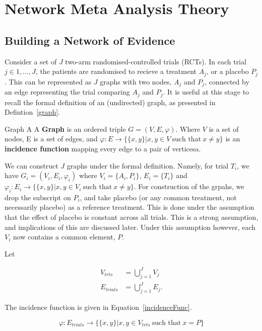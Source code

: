 \chapter{Network Meta Analysis Theory}\label{nmatheory}

\section{Building a Network of Evidence}

Consider a set of $J$ two-arm randomised-controlled trials (RCTs). In each trial $j \in 1,\ldots,J$, the patients are randomised to recieve a treatment $A_j$, or a placebo $P_j$. This can be represented as $J$ graphs with two nodes, $A_j$ and $P_j$, connected by an edge representing the trial comparing $A_j$ and $P_j$. It is useful at this stage to recall the formal definition of an (undirected) graph, as presented in Defintion~\ref{graph}. 

\begin{definition}[label=graph]{Graph}
A  A \textbf{Graph} is an ordered triple $G = (V, E, \varphi)$. Where  $V$ is a set of nodes, E is a set  of edges, and $\varphi : E \to \{\{ x, y \} | x, y \in V \ \text{such that} \ x \neq y \}$ is an  \textbf{incidence function} mapping every edge to a pair of verticesa.
\end{definition}

We can construct $J$ graphs under the formal definition. Namely, for trial $T_i$, we have $G_i = (V_i, E_i, \varphi_i)$ where $V_i = \{ A_i, P_i \}$, $E_i = \{T_i\}$ and $\varphi_i : E_i \to \{ \{ x, y \} | x, y \in V_i \ \text{such that} \  x \neq y \}$. For construction of the grpahs, we drop the subscript on $P_i$, and take placebo (or any common treatment, not necessarily placebo) as a reference treatment. This is done under the assumption that the effect of placebo is constant across all trials. This is a strong assumption, and implications of this are discussed later. Under this assumption however, each $V_i$ now contains a common element, $P$.

Let

\begin{align}
    V_{trts} &= \bigcup_{j=1}^{J} V_j \\
    E_{trials} &= \bigcup_{j=1}^{J} E_j
.\end{align}

The incidence function is given in Equation~\ref{incidenceFunc}.

\begin{equation}
    \varphi : E_{trials} \to \{ \{x, y \} | x, y \in V_{trts} \ \text{such that} \ x = P \}
    \label{incidenceFunc}
\end{equation}

